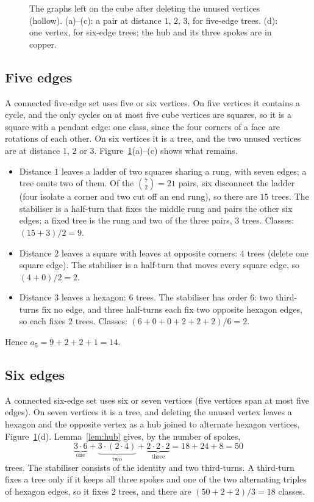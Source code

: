 \documentclass[11pt]{amsart}
\theoremstyle{remark}
\begin{document}
\begin{figure}[ht]
\centering

\caption{The graphs left on the cube after deleting the unused vertices (hollow). (a)--(c): a pair at distance $1$, $2$, $3$, for five-edge trees. (d): one vertex, for six-edge trees; the hub and its three spokes are in copper.}
\label{fig:cube}
\end{figure}

\subsection{Five edges}

A connected five-edge set uses five or six vertices. On five vertices it contains a cycle, and the only cycles on at most five cube vertices are squares, so it is a square with a pendant edge: one class, since the four corners of a face are rotations of each other. On six vertices it is a tree, and the two unused vertices are at distance $1$, $2$ or $3$. Figure~\ref{fig:cube}(a)--(c) shows what remains.
\begin{itemize}
\item Distance $1$ leaves a ladder of two squares sharing a rung, with seven edges; a tree omits two of them. Of the $\binom72=21$ pairs, six disconnect the ladder (four isolate a corner and two cut off an end rung), so there are $15$ trees. The stabiliser is a half-turn that fixes the middle rung and pairs the other six edges; a fixed tree is the rung and two of the three pairs, $3$ trees. Classes: $(15+3)/2=9$.
\item Distance $2$ leaves a square with leaves at opposite corners: $4$ trees (delete one square edge). The stabiliser is a half-turn that moves every square edge, so $(4+0)/2=2$.
\item Distance $3$ leaves a hexagon: $6$ trees. The stabiliser has order $6$: two third-turns fix no edge, and three half-turns each fix two opposite hexagon edges, so each fixes $2$ trees. Classes: $(6+0+0+2+2+2)/6=2$.
\end{itemize}
Hence $a_5=9+2+2+1=14$.

\subsection{Six edges}

A connected six-edge set uses six or seven vertices (five vertices span at most five edges). On seven vertices it is a tree, and deleting the unused vertex leaves a hexagon and the opposite vertex as a hub joined to alternate hexagon vertices, Figure~\ref{fig:cube}(d). Lemma~\ref{lem:hub} gives, by the number of spokes,
\[
\underbrace{3\cdot6}_{\text{one}}+\underbrace{3\cdot(2\cdot4)}_{\text{two}}+\underbrace{2\cdot2\cdot2}_{\text{three}}=18+24+8=50
\]
trees. The stabiliser consists of the identity and two third-turns. A third-turn fixes a tree only if it keeps all three spokes and one of the two alternating triples of hexagon edges, so it fixes $2$ trees, and there are $(50+2+2)/3=18$ classes.
\end{document}
